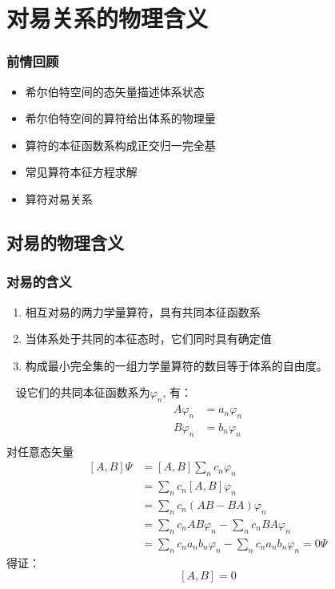 \section{对易关系的物理含义}

\begin{frame}
    \frametitle{前情回顾}
    \begin{itemize}
        \item 希尔伯特空间的态矢量描述体系状态
        \item 希尔伯特空间的算符给出体系的物理量
        \item 算符的本征函数系构成正交归一完全基
        \item 常见算符本征方程求解
        \item 算符对易关系
    \end{itemize}   
\end{frame} 

\subsection{对易的物理含义}

\begin{frame} 
    \frametitle{对易的含义}
    \begin{enumerate}
        \item  相互对易的两力学量算符，具有共同本征函数系
        \item  当体系处于共同的本征态时，它们同时具有确定值
        \item  构成最小完全集的一组力学量算符的数目等于体系的自由度。
    \end{enumerate}
\end{frame} 

\begin{frame} [allowframebreaks=]
    \证~ 设它们的共同本征函数系为{$\varphi_n$}, 有：
        \begin{equation*}
            \begin{split} 
            A\varphi_n&=a_n \varphi_n \\
            B\varphi_n&=b_n \varphi_n \\
            \end{split}  
        \end{equation*}  
        对任意态矢量
        \begin{equation*}
            \begin{split} 
            [A,B]\Psi &= [A,B]\sum_n c_n \varphi_n \\
            &= \sum_n c_n [A,B]\varphi_n \\
            &= \sum_n c_n (AB-BA)\varphi_n\\
            &= \sum_n c_n AB\varphi_n- \sum_n c_n BA\varphi_n\\
            &= \sum_n c_n a_nb_n\varphi_n- \sum_n c_n a_nb_n\varphi_n=0\Psi
            \end{split}  
        \end{equation*}  
        得证： $$[A,B]=0$$
\end{frame} 

